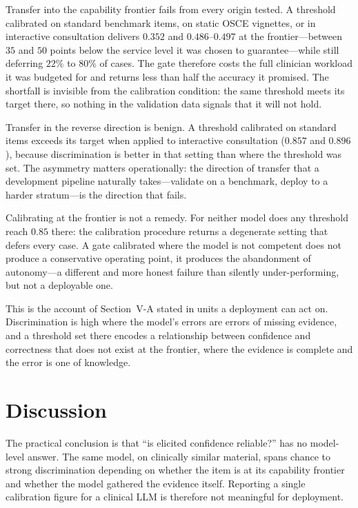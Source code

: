 \documentclass[journal,twoside]{IEEEtran}
\begin{document}
Transfer into the capability frontier fails from every origin tested. A threshold calibrated on
standard benchmark items, on static OSCE vignettes, or in interactive consultation delivers
$0.352$ and $0.486$--$0.497$ at the frontier---between $35$ and $50$ points below the service level
it was chosen to guarantee---while still deferring $22\%$ to $80\%$ of cases. The gate therefore
costs the full clinician workload it was budgeted for and returns less than half the accuracy it
promised. The shortfall is invisible from the calibration condition: the same threshold meets its
target there, so nothing in the validation data signals that it will not hold.

Transfer in the reverse direction is benign. A threshold calibrated on standard items exceeds its
target when applied to interactive consultation ($0.857$ and $0.896$), because discrimination is
better in that setting than where the threshold was set. The asymmetry matters operationally: the
direction of transfer that a development pipeline naturally takes---validate on a benchmark, deploy
to a harder stratum---is the direction that fails.

Calibrating at the frontier is not a remedy. For neither model does any threshold reach $0.85$
there: the calibration procedure returns a degenerate setting that defers every case. A gate
calibrated where the model is not competent does not produce a conservative operating point, it
produces the abandonment of autonomy---a different and more honest failure than silently
under-performing, but not a deployable one.

This is the account of Section~V-A stated in units a deployment can act on. Discrimination is high
where the model's errors are errors of missing evidence, and a threshold set there encodes a
relationship between confidence and correctness that does not exist at the frontier, where the
evidence is complete and the error is one of knowledge.

\section{Discussion}

The practical conclusion is that ``is elicited confidence reliable?'' has no model-level answer. The
same model, on clinically similar material, spans chance to strong discrimination depending on
whether the item is at its capability frontier and whether the model gathered the evidence itself. Reporting a single calibration figure for a clinical LLM is
therefore not meaningful for deployment.
\end{document}
